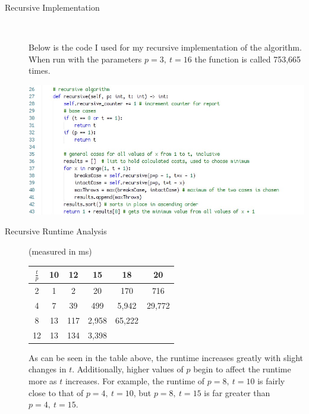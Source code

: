 \documentclass[12pt]{article}
\begin{document}
\begin{description}
    \item [Recursive Implementation]\ 
    
    Below is the code I used for my recursive implementation of the algorithm.
    When run with the parameters $p = 3,~t = 16$ the function is called 753,665 times.
    \begin{center}
        \includegraphics[width=5.5in]{recursive.png}
    \end{center}

    \item [Recursive Runtime Analysis] (measured in ms)
    
    \begin{center}
        \begin{tabular}{|c|c|c|c|c|c|}\hline
            $\frac{t}{p}$ & 10 & 12 & 15 & 18 & 20 \\\hline
            2 & 1 & 2 & 20 & 170 & 716 \\\hline
            4 & 7 & 39 & 499 & 5,942 & 29,772\\\hline
            8 & 13 & 117 & 2,958 & 65,222 & \\\hline
            12 & 13 & 134 & 3,398 & & \\\hline
        \end{tabular}
    \end{center}
    As can be seen in the table above, the runtime increases greatly with slight
    changes in $t$. Additionally, higher values of $p$ begin to affect the runtime
    more as $t$ increases. For example, the runtime of $p = 8,~t = 10$ is fairly
    close to that of $p = 4,~t = 10$, but $p = 8,~t = 15$ is far greater than
    $p = 4,~t = 15$.
\end{description}
\end{document}
